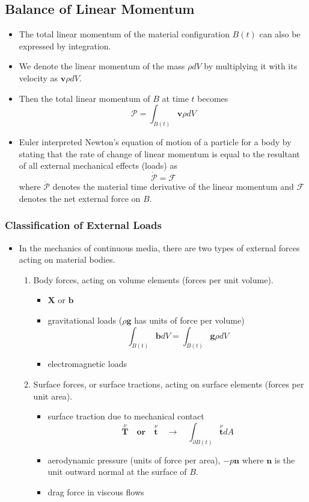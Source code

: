 \documentclass[11pt]{article}
\begin{document}
\subsection*{Balance of Linear Momentum}
\label{sec:org77299ed}
\begin{itemize}
\item The total linear momentum of the material configuration \(B(t)\) can also be expressed by integration.
\item We denote the linear momentum of the mass \(\rho dV\) by multiplying it with its velocity as \(\boldsymbol{v} \rho dV\).
\item Then the total linear momentum of \(B\) at time \(t\) becomes
$$ \mathcal{P} = \int_{B(t)} \boldsymbol{v} \rho dV $$
\item Euler interpreted Newton's equation of motion of a particle for a body by stating that the rate of change of linear momentum is equal to the resultant of all external mechanical effects (loads) as
$$ \dot{\mathcal{P}} = \mathcal{F} $$
where \(\dot{\mathcal{P}}\) denotes the material time derivative of the linear momentum and \(\mathcal{F}\) denotes the net external force on \(B\).
\end{itemize}
\subsubsection*{Classification of External Loads}
\label{sec:org20dd191}
\begin{itemize}
\item In the mechanics of continuous media, there are two types of external forces acting on material bodies.
\begin{enumerate}
\item Body forces, acting on volume elements (forces per unit volume).
\begin{itemize}
\item \(\boldsymbol{X}\) or \(\boldsymbol{b}\)
\item gravitational loads (\(\rho \boldsymbol{g}\) has units of force per volume)
$$ \int_{B(t)} \boldsymbol{b} dV = \int_{B(t)} \boldsymbol{g} \rho dV$$
\item electromagnetic loads
\end{itemize}
\item Surface forces, or surface tractions, acting on surface elements (forces per unit area).
\begin{itemize}
\item surface traction due to mechanical contact
$$ \overset{\nu}{\boldsymbol{T}} \quad \mathbf{or} \quad \overset{\nu}{\boldsymbol{t}} \quad \to \quad \int_{\partial B(t)} \overset{\nu}{\boldsymbol{t}} dA $$
\item aerodynamic pressure (units of force per area), \(-p\boldsymbol{n}\)
where \(\boldsymbol{n}\) is the unit outward normal at the surface of \(B\).
\item drag force in viscous flows
\end{itemize}
\end{enumerate}
\end{itemize}
\end{document}
